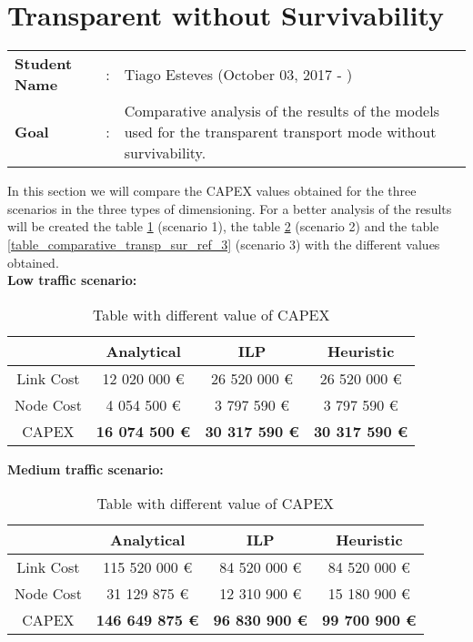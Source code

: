 \clearpage

\section{Transparent without Survivability}\label{comparative_Transp_Survivability}
\begin{tcolorbox}	
\begin{tabular}{p{2.75cm} p{0.2cm} p{10.5cm}} 	
\textbf{Student Name}  &:& Tiago Esteves    (October 03, 2017 - )\\
\textbf{Goal}          &:& Comparative analysis of the results of the models used for the transparent transport mode without survivability.
\end{tabular}
\end{tcolorbox}
\vspace{11pt}


In this section we will compare the CAPEX values obtained for the three scenarios in the three types of dimensioning. For a better analysis of the results will be created the table \ref{table_comparative_transp_sur_ref_1} (scenario 1), the table \ref{table_comparative_transp_sur_ref_2} (scenario 2) and the table \ref{table_comparative_transp_sur_ref_3} (scenario 3) with the different values obtained.\\

\textbf{Low traffic scenario:}

\begin{table}[h!]
\centering
\begin{tabular}{| c | c | c | c |}
 \hline
   & Analytical & ILP & Heuristic \\
 \hline\hline
 Link Cost & 12 020 000 \euro & 26 520 000 \euro & 26 520 000 \euro \\
 Node Cost & 4 054 500 \euro & 3 797 590 \euro & 3 797 590 \euro \\
 CAPEX & \textbf{16 074 500 \euro} & \textbf{30 317 590 \euro} & \textbf{30 317 590 \euro} \\
 \hline
\end{tabular}
\caption{Table with different value of CAPEX }
\label{table_comparative_transp_sur_ref_1}
\end{table}


\vspace{11pt}
\textbf{Medium traffic scenario:}

\begin{table}[h!]
\centering
\begin{tabular}{| c | c | c | c |}
 \hline
   & Analytical & ILP & Heuristic \\
 \hline\hline
 Link Cost & 115 520 000 \euro & 84 520 000 \euro & 84 520 000 \euro \\
 Node Cost & 31 129 875 \euro & 12 310 900 \euro & 15 180 900 \euro \\
 CAPEX & \textbf{146 649 875 \euro} & \textbf{96 830 900 \euro} & \textbf{99 700 900 \euro} \\
 \hline
\end{tabular}
\caption{Table with different value of CAPEX }
\label{table_comparative_transp_sur_ref_2}
\end{table}


